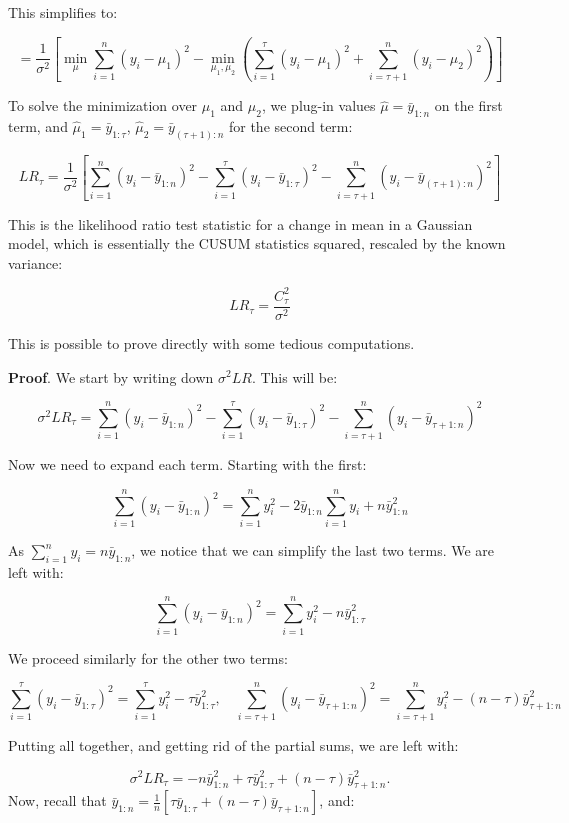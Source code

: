 \documentclass[
  letterpaper,
  DIV=11,
  numbers=noendperiod]{scrreprt}
\begin{document}
This simplifies to:

\[
= \frac{1}{\sigma^2} \left[ \min_{\mu} \sum_{i=1}^n (y_i - \mu_1)^2 - \min_{\mu_1, \mu_2} \left( \sum_{i=1}^\tau (y_i - \mu_1)^2 + \sum_{i=\tau+1}^n (y_i - \mu_2)^2 \right) \right]
\]

To solve the minimization over \(\mu_1\) and \(\mu_2\), we plug-in
values \(\hat\mu = \bar{y}_{1:n}\) on the first term, and
\(\hat\mu_1 = \bar{y}_{1:\tau}\), \(\hat\mu_2 = \bar{y}_{(\tau+1):n}\)
for the second term:

\[
LR_\tau = \frac{1}{\sigma^2} \left[ \sum_{i=1}^n (y_i - \bar{y}_{1:n})^2 - \sum_{i=1}^\tau (y_i - \bar{y}_{1:\tau})^2 - \sum_{i=\tau+1}^n (y_i - \bar{y}_{(\tau+1):n})^2 \right]
\]

This is the likelihood ratio test statistic for a change in mean in a
Gaussian model, which is essentially the CUSUM statistics squared,
rescaled by the known variance:

\[
LR_\tau = \frac{C_\tau^2}{\sigma^2}
\]

This is possible to prove directly with some tedious computations.

\textbf{Proof}. We start by writing down \(\sigma^2 LR\). This will be:

\[
\sigma^2 LR_\tau = \sum_{i=1}^{n} (y_i - \bar{y}_{1:n})^2 - \sum_{i=1}^{\tau} (y_i - \bar{y}_{1:\tau})^2 - \sum_{i=\tau+1}^{n} (y_i - \bar{y}_{\tau+1:n})^2
\]

Now we need to expand each term. Starting with the first:

\[
\sum_{i=1}^{n} (y_i - \bar{y}_{1:n})^2 = \sum_{i=1}^{n} y_i^2  - 2 \bar{y}_{1:n} \sum_{i=1}^{n} y_i + n \bar{y}_{1:n}^2 
\]

As \(\sum_{i=1}^{n} y_i = n \bar{y}_{1:n}\), we notice that we can
simplify the last two terms. We are left with:

\[
\sum_{i=1}^{n} (y_i - \bar{y}_{1:n})^2 = \sum_{i=1}^{n} y_i^2 - n \bar{y}_{1:\tau}^2
\]

We proceed similarly for the other two terms:

\[
\sum_{i=1}^{\tau} (y_i - \bar{y}_{1:\tau})^2 = \sum_{i=1}^{\tau} y_i^2 - \tau \bar{y}_{1:\tau}^2, \quad \sum_{i=\tau + 1}^{n} (y_i - \bar{y}_{\tau+1:n})^2 = \sum_{i=\tau+1}^{n} y_i^2 - (n-\tau) \bar{y}_{\tau+1:n}^2
\]

Putting all together, and getting rid of the partial sums, we are left
with:

\[
\sigma^2 LR_\tau = - n \bar{y}_{1:n}^2 + \tau \bar{y}_{1:\tau}^2 + (n - \tau) \bar{y}_{\tau+1:n}^2.
\] Now, recall that
\(\bar{y}_{1:n} = \frac{1}{n} \left[ \tau \bar{y}_{1:\tau} + (n - \tau) \bar{y}_{\tau+1:n} \right]\),
and:
\end{document}
